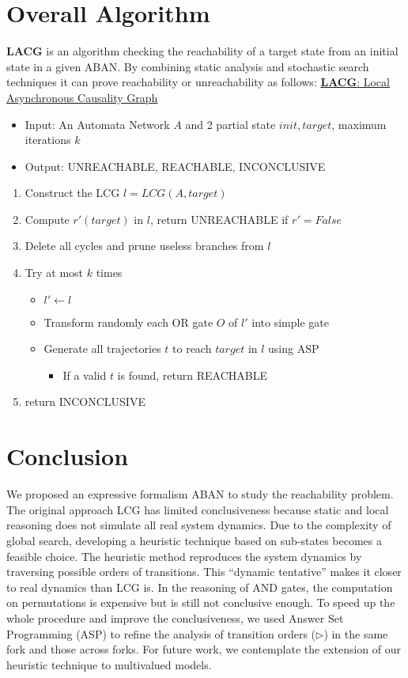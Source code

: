 \documentclass[en]{jdoc}
\begin{document}
\section{Overall Algorithm}
{\bf LACG} is an algorithm checking the reachability of a target state from an initial state in a given ABAN. 
By combining static analysis and stochastic search techniques it can prove reachability or unreachability as follows:
\uline{{\bf LACG}: Local Asynchronous Causality Graph}
\begin{itemize}
    \item Input: An Automata Network $A$ and 2 partial state $init, target$, maximum iterations $k$ 
    \item Output: UNREACHABLE, REACHABLE, INCONCLUSIVE
\end{itemize}
\begin{enumerate}
    \item Construct the LCG $l=LCG(A,target)$
    \item Compute $r'(target)$ in $l$, return UNREACHABLE if $r'=False$
    \item Delete all cycles and prune useless branches from $l$
    \item Try at most $k$ times
    \begin{itemize}
    \item $l'\gets l$
    \item  Transform randomly each OR gate $O$ of $l'$ into simple gate
    \item Generate all trajectories $t$ to reach $target$ in $l$ using ASP
    \begin{itemize}
        \item If a valid $t$ is found, return REACHABLE
    \end{itemize}
    \end{itemize}
    \item return INCONCLUSIVE
\end{enumerate}
\section{Conclusion}
We proposed an expressive formalism ABAN to study the reachability problem. 
The original approach LCG has limited conclusiveness because static and local reasoning does not simulate all real system dynamics. 
Due to the complexity of global search, developing a heuristic technique based on sub-states becomes a feasible choice. 
The heuristic method reproduces the system dynamics by traversing possible orders of transitions. 
This ``dynamic tentative'' makes it closer to real dynamics than LCG is.
In the reasoning of AND gates, the computation on permutations is expensive but is still not conclusive enough.
To speed up the whole procedure and improve the conclusiveness, we used Answer Set Programming (ASP) to refine the analysis of transition orders ($\triangleright$) in the same fork and those across forks.
For future work, we contemplate the extension of our heuristic technique to multivalued models.

\end{document}
